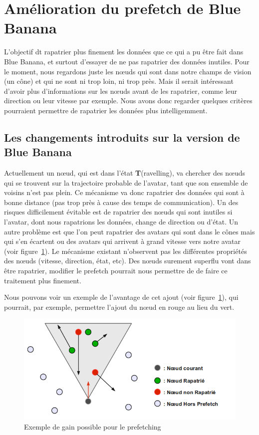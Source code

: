 \section{Amélioration du prefetch de Blue Banana}

L'objectif  dt rapatrier plus finement les données que ce qui a pu être fait dans Blue Banana, et surtout d'essayer de ne pas rapatrier des données inutiles. Pour le moment, nous regardons juste les nœuds qui sont dans notre champs de vision (un cône) et qui ne sont ni trop loin, ni trop près. Mais il serait intéressant d'avoir plus d'informations sur les nœuds avant de les rapatrier, comme leur direction ou leur vitesse par exemple. Nous avons donc regarder quelques critères pourraient permettre de rapatrier les données plus intelligemment.

\subsection{Les changements introduits sur la version de Blue Banana}


\par Actuellement un nœud, qui est dans l'état \textbf{T}(ravelling), va chercher des nœuds qui se trouvent sur la trajectoire probable de l'avatar, tant que son ensemble de voisins n'est pas plein. Ce mécanisme va donc rapatrier des données qui sont à bonne distance (pas trop près à cause des temps de communication). Un des risques difficilement évitable est de rapatrier des nœuds qui sont inutiles si l'avatar, dont nous rapatrions les données, change de direction ou d'état. Un autre problème est que l'on peut rapatrier des avatars qui sont dans le cônes mais qui s'en écartent ou des avatars qui arrivent à grand vitesse vers notre avatar (voir figure~\ref{prefetchav}). Le mécanisme existant n'observent pas les différentes propriétés des nœuds (vitesse, direction, état, etc). Des nœuds surement superflu vont dans être rapatrier, modifier le prefetch pourrait nous permettre de de faire ce traitement plus finement.

\par  Nous pouvons voir un exemple de l'avantage de cet ajout (voir figure~\ref{prefetchav}), qui pourrait, par exemple, permettre l'ajout du nœud en rouge au lieu du vert.

	\begin{figure}[!h]
        \centering
        \includegraphics[scale=0.45]{./Ressources/Images/prefetchaV1.png}
        \caption{Exemple de gain possible pour le prefetching}
        \label{prefetchav}
        \end{figure}

